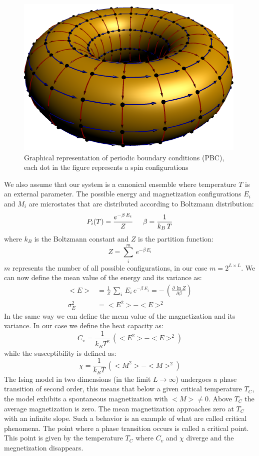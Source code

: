 \documentclass[%
preprint,
 amsmath,amssymb,
 aps,
]{revtex4-1}
\theoremstyle{plain}
\theoremstyle{definition}
\theoremstyle{plain}
\begin{document}
\begin{figure}
\includegraphics[scale=0.5]{torus}
\caption{Graphical representation of periodic boundary conditions (PBC), each dot in the figure represents a spin configurations}
\label{PBC}
\end{figure}
We also assume that our system is a canonical ensemble where temperature $T$ is an external parameter. The possible energy and magnetization configurations $E_i$ and $M_i$ are microstates that are distributed according to Boltzmann distribution:
\begin{equation}
\label{boltzmann_pdf}
P_i(T) = \frac{e^{-\beta \, E_i}}{Z} \hspace{0.5cm} \beta = \frac{1}{k_B \, T}
\end{equation}
where $k_B$ is the Boltzmann constant and $Z$ is the partition function:
\begin{equation}
Z = \sum_{i} ^m \, e^{-\beta \, E_i }
\end{equation}
$m$ represents the number of all possible configurations, in our case $m=2^{L \times L}$.
We can now define the mean value of the energy and its variance as:
\begin{align}
<E> &= \frac{1}{Z} \, \sum_i \, E_i \, e^{-\beta \, E_i} = - \, \left(\frac{\partial \, \ln{Z}}{\partial \beta} \right) \\
\sigma^2_E &= <E^2> - <E>^2 
\end{align}
In the same way we can define the mean value of the magnetization and its variance.
In our case we define the heat capacity as:
\begin{equation}
\label{heat}
C_v = \frac{1}{k_B T^2} \, (<E^2> - <E>^2 )
\end{equation}
while the susceptibility is defined as:
\begin{equation}
\label{chi}
\chi = \frac{1}{k_B T} \, (<M^2> - <M>^2 )
\end{equation}
The Ising model in two dimensions (in the limit $L \to \infty$) undergoes a phase transition of second order, this means that below a given critical temperature $T_C$, the model exhibits a spontaneous magnetization with $<M>  \neq 0$. Above $T_C$ the average magnetization is zero. The mean magnetization approaches zero at $T_C$ with an infinite slope. Such a behavior is an example of what are called critical phenomena. The point where a phase transition occurs is called a critical point. This point is given by the temperature $T_C$ where $C_v$ and $\chi$ diverge and the megnetization disappears. 
\end{document}
